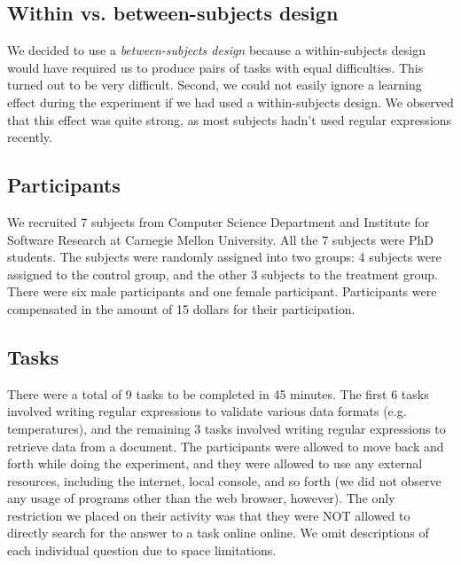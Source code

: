 \documentclass[10pt, conference, compsocconf]{IEEEtran}
\begin{document}
\subsection{Within vs. between-subjects design}

We decided to use a \textit{between-subjects design} because a within-subjects design would have required us to produce pairs of tasks with equal difficulties. This turned out to be very difficult. Second, we could not easily ignore a learning effect during the experiment if we had used a within-subjects design. We observed that this effect was quite strong, as most subjects hadn't used regular expressions recently.

\subsection{Participants}

We recruited 7 subjects from Computer Science Department and Institute for Software Research at Carnegie Mellon University. All the 7 subjects were PhD students. The subjects were randomly assigned into two groups: 4 subjects were assigned to the control group, and the other 3 subjects to the treatment group. There were six male participants and one female participant. Participants were compensated in the amount of 15 dollars for their participation.

\subsection{Tasks}

There were a total of 9 tasks to be completed in 45 minutes. The first 6 tasks involved writing regular expressions to validate various data formats (e.g. temperatures), and the remaining 3 tasks involved writing regular expressions to retrieve data from a document. The participants were allowed to move back and forth while doing the experiment, and they were allowed to use any external resources, including the internet, local console, and so forth (we did not observe any usage of programs other than the web browser, however). The only restriction we placed on their activity was that they were NOT allowed to directly search for the answer to a task online online. We omit descriptions of each individual question due to space limitations.
\end{document}
